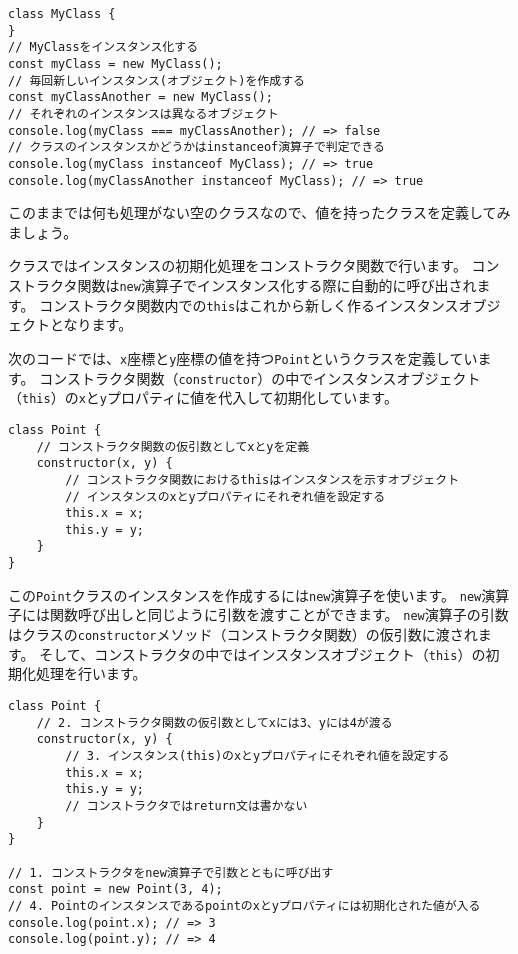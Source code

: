 \begin{lstlisting}
class MyClass {
}
// MyClassをインスタンス化する
const myClass = new MyClass();
// 毎回新しいインスタンス(オブジェクト)を作成する
const myClassAnother = new MyClass();
// それぞれのインスタンスは異なるオブジェクト
console.log(myClass === myClassAnother); // => false
// クラスのインスタンスかどうかはinstanceof演算子で判定できる
console.log(myClass instanceof MyClass); // => true
console.log(myClassAnother instanceof MyClass); // => true
\end{lstlisting}

このままでは何も処理がない空のクラスなので、値を持ったクラスを定義してみましょう。

クラスではインスタンスの初期化処理をコンストラクタ関数で行います。
コンストラクタ関数は\texttt{new}演算子でインスタンス化する際に自動的に呼び出されます。
コンストラクタ関数内での\texttt{this}はこれから新しく作るインスタンスオブジェクトとなります。

次のコードでは、\texttt{x}座標と\texttt{y}座標の値を持つ\texttt{Point}というクラスを定義しています。
コンストラクタ関数（\texttt{constructor}）の中でインスタンスオブジェクト（\texttt{this}）の\texttt{x}と\texttt{y}プロパティに値を代入して初期化しています。

\begin{lstlisting}
class Point {
    // コンストラクタ関数の仮引数としてxとyを定義
    constructor(x, y) {
        // コンストラクタ関数におけるthisはインスタンスを示すオブジェクト
        // インスタンスのxとyプロパティにそれぞれ値を設定する
        this.x = x;
        this.y = y;
    }
}
\end{lstlisting}

この\texttt{Point}クラスのインスタンスを作成するには\texttt{new}演算子を使います。
\texttt{new}演算子には関数呼び出しと同じように引数を渡すことができます。
\texttt{new}演算子の引数はクラスの\texttt{constructor}メソッド（コンストラクタ関数）の仮引数に渡されます。
そして、コンストラクタの中ではインスタンスオブジェクト（\texttt{this}）の初期化処理を行います。

\begin{lstlisting}
class Point {
    // 2. コンストラクタ関数の仮引数としてxには3、yには4が渡る
    constructor(x, y) {
        // 3. インスタンス(this)のxとyプロパティにそれぞれ値を設定する
        this.x = x;
        this.y = y;
        // コンストラクタではreturn文は書かない
    }
}

// 1. コンストラクタをnew演算子で引数とともに呼び出す
const point = new Point(3, 4);
// 4. Pointのインスタンスであるpointのxとyプロパティには初期化された値が入る
console.log(point.x); // => 3
console.log(point.y); // => 4
\end{lstlisting}

